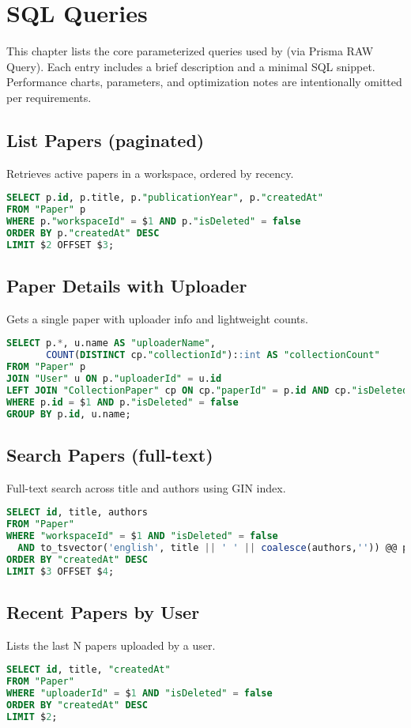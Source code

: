 \chapter{SQL Queries}
\label{ch:sql-queries}

This chapter lists the core parameterized queries used by \projectname{} (via Prisma RAW Query). Each entry includes a brief description and a minimal SQL snippet. Performance charts, parameters, and optimization notes are intentionally omitted per requirements.

\section{List Papers (paginated)}
Retrieves active papers in a workspace, ordered by recency.
\begin{lstlisting}[language=SQL]
SELECT p.id, p.title, p."publicationYear", p."createdAt"
FROM "Paper" p
WHERE p."workspaceId" = $1 AND p."isDeleted" = false
ORDER BY p."createdAt" DESC
LIMIT $2 OFFSET $3;
\end{lstlisting}

\section{Paper Details with Uploader}
Gets a single paper with uploader info and lightweight counts.
\begin{lstlisting}[language=SQL]
SELECT p.*, u.name AS "uploaderName",
       COUNT(DISTINCT cp."collectionId")::int AS "collectionCount"
FROM "Paper" p
JOIN "User" u ON p."uploaderId" = u.id
LEFT JOIN "CollectionPaper" cp ON cp."paperId" = p.id AND cp."isDeleted" = false
WHERE p.id = $1 AND p."isDeleted" = false
GROUP BY p.id, u.name;
\end{lstlisting}

\section{Search Papers (full-text)}
Full-text search across title and authors using GIN index.
\begin{lstlisting}[language=SQL]
SELECT id, title, authors
FROM "Paper"
WHERE "workspaceId" = $1 AND "isDeleted" = false
  AND to_tsvector('english', title || ' ' || coalesce(authors,'')) @@ plainto_tsquery($2)
ORDER BY "createdAt" DESC
LIMIT $3 OFFSET $4;
\end{lstlisting}

\section{Recent Papers by User}
Lists the last N papers uploaded by a user.
\begin{lstlisting}[language=SQL]
SELECT id, title, "createdAt"
FROM "Paper"
WHERE "uploaderId" = $1 AND "isDeleted" = false
ORDER BY "createdAt" DESC
LIMIT $2;
\end{lstlisting}

